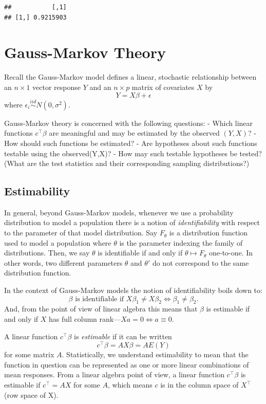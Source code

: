 \documentclass[
]{book}
\begin{document}
\begin{verbatim}
##           [,1]
## [1,] 0.9215903
\end{verbatim}

\hypertarget{gauss-markov-theory}{%
\chapter{Gauss-Markov Theory}\label{gauss-markov-theory}}

Recall the Gauss-Markov model defines a linear, stochastic relationship between an \(n\times 1\) vector response \(Y\) and an \(n\times p\) matrix of covariates \(X\) by
\[Y = X\beta + \epsilon\]
where \(\epsilon_i \stackrel{iid}{\sim} N(0,\sigma^2)\).

Gauss-Markov theory is concerned with the following questions:
- Which linear functions \(c^\top \beta\) are meaningful and may be estimated by the observed \((Y,X)\)?
- How should such functions be estimated?
- Are hypotheses about such functions testable using the observed(Y,X)?
- How may such testable hypotheses be tested? (What are the test statistics and their corresponding sampling distributions?)

\hypertarget{estimability}{%
\section{Estimability}\label{estimability}}

In general, beyond Gauss-Markov models, whenever we use a probability distribution to model a population there is a notion of \emph{identifiability} with respect to the parameter of that model distribution. Say \(F_\theta\) is a distribution function used to model a population where \(\theta\) is the parameter indexing the family of distributions. Then, we say \(\theta\) is identifiable if and only if \(\theta\mapsto F_\theta\) one-to-one. In other words, two different parameters \(\theta\) and \(\theta'\) do not correspond to the same distribution function.

In the context of Gauss-Markov models the notion of identifiability boils down to:
\[\beta\text{ is identifiable if }X\beta_1\ne X\beta_2\iff \beta_1\ne \beta_2.\]
And, from the point of view of linear algebra this means that \(\beta\) is estimable if and only if \(X\) has full column rank---\(Xa = 0 \iff a \equiv 0\).

A linear function \(c^\top \beta\) is \emph{estimable} if it can be written
\[c^\top \beta = AX\beta = AE(Y)\]
for some matrix \(A\). Statistically, we understand estimability to mean that the function in question can be represented as one or more linear combinations of mean responses. From a linear algebra point of view, a linear function \(c^\top \beta\) is estimable if \(c^\top = AX\) for some \(A\), which means \(c\) is in the column space of \(X^\top\) (row space of X).
\end{document}
